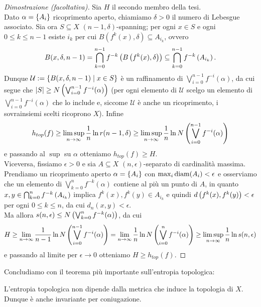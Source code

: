\begin{proof}[Dimostrazione (facoltativa)]Sia $H$ il secondo membro della tesi. \\
Dato $\alpha=\left\{A_i\right\}$ ricoprimento aperto, chiamiamo $\delta>0$ il numero di Lebesgue
associato. Sia ora $S\subseteq X$ $(n-1,\delta)$-spanning; per ogni $x\in S$ e ogni $0\le k\le n-1$ esiste $i_k$ per cui
$B(f^k(x),\delta)\subseteq A_{i_k}$, ovvero
\[ B(x,\delta,n-1)=\bigcap_{k=0}^{n-1} f^{-k}\left(B\left(f^k(x),\delta\right)\right)\subseteq\bigcap_{k=0}^{n-1} f^{-k}\left(A_{i_k}\right). \]
Dunque $\mathcal{U}:=\left\{B(x,\delta,n-1)\mid x\in S\right\}$ è un raffinamento di $\bigvee_{i=0}^{n-1}f^{-i}(\alpha)$,
da cui segue che $\left|S\right|\ge N\left(\bigvee_{i=0}^{n-1}f^{-i}(\alpha)\right)$ (per ogni elemento di $\mathcal{U}$
scelgo un elemento di $\bigvee_{i=0}^{n-1}f^{-i}(\alpha)$ che lo include e, siccome $\mathcal{U}$ è anche un ricoprimento,
i sovrainsiemi scelti ricoprono $X$). Infine
\[ h_{top}(f)\ge\limsup_{n\to\infty}\frac{1}{n}\ln r(n-1,\delta)
\ge\limsup_{n\to\infty}\frac{1}{n}\ln N\left(\bigvee_{i=0}^{n-1}f^{-i}(\alpha)\right) \]
e passando al $\sup$ su $\alpha$ otteniamo $h_{top}(f)\ge H$. \\
Viceversa, fissiamo $\epsilon>0$ e sia $A\subseteq X$ $(n,\epsilon)$-separato di cardinalità massima.
Prendiamo un ricoprimento aperto $\alpha=\left\{A_i\right\}$ con $\max_i\operatorname{diam}(A_i)<\epsilon$ e osserviamo
che un elemento di $\bigvee_{k=0}^n f^{-k}(\alpha)$ contiene al più un punto di $A$,
in quanto $x,y\in\bigcap_{k=0}^n f^{-k}\left(A_{i_k}\right)$ implica $f^k(x),f^k(y)\in A_{i_k}$ e quindi $d\left(f^k(x),f^k(y)\right)<\epsilon$
per ogni $0\le k\le n$, da cui $d_n(x,y)<\epsilon$. \\
Ma allora $s(n,\epsilon)\le N\left(\bigvee_{k=0}^n f^{-k}(\alpha)\right)$, da cui
\[ H\ge\lim_{n\to\infty}\frac{1}{n-1}\ln N\left(\bigvee_{i=0}^{n-1}f^{-i}(\alpha)\right)
=\lim_{n\to\infty}\frac{1}{n}\ln N\left(\bigvee_{i=0}^n f^{-i}(\alpha)\right)\ge\limsup_{n\to\infty}\frac{1}{n}\ln s(n,\epsilon) \]
e passando al limite per $\epsilon\to 0$ otteniamo $H\ge h_{top}(f)$.
\end{proof}

Concludiamo con il teorema più importante sull'entropia topologica:

\begin{teo}L'entropia topologica non dipende dalla metrica che induce la topologia di $X$.
Dunque è anche invariante per coniugazione.
\end{teo}


